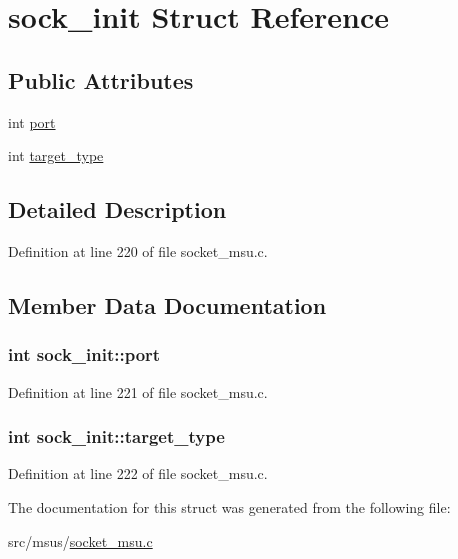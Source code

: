 \hypertarget{structsock__init}{\section{sock\-\_\-init Struct Reference}
\label{structsock__init}
}
\subsection*{Public Attributes}
\begin{DoxyCompactItemize}
\item 
int \hyperlink{structsock__init_ac593df260ab8a897e1d2238746b2815a}{port}
\item 
int \hyperlink{structsock__init_a17b3cc4807be7313acf0de7aea1cf1fb}{target\-\_\-type}
\end{DoxyCompactItemize}


\subsection{Detailed Description}


Definition at line 220 of file socket\-\_\-msu.\-c.



\subsection{Member Data Documentation}
\hypertarget{structsock__init_ac593df260ab8a897e1d2238746b2815a}{
\subsubsection[{port}]{\setlength{\rightskip}{0pt plus 5cm}int sock\-\_\-init\-::port}}\label{structsock__init_ac593df260ab8a897e1d2238746b2815a}


Definition at line 221 of file socket\-\_\-msu.\-c.

\hypertarget{structsock__init_a17b3cc4807be7313acf0de7aea1cf1fb}{
\subsubsection[{target\-\_\-type}]{\setlength{\rightskip}{0pt plus 5cm}int sock\-\_\-init\-::target\-\_\-type}}\label{structsock__init_a17b3cc4807be7313acf0de7aea1cf1fb}


Definition at line 222 of file socket\-\_\-msu.\-c.



The documentation for this struct was generated from the following file\-:\begin{DoxyCompactItemize}
\item 
src/msus/\hyperlink{socket__msu_8c}{socket\-\_\-msu.\-c}\end{DoxyCompactItemize}
